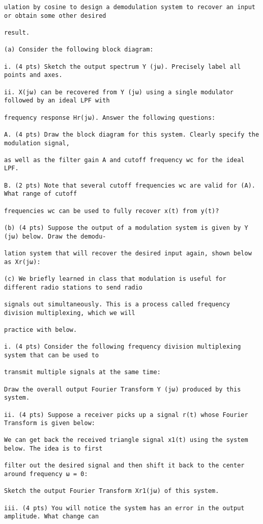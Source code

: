 \documentclass[11pt,addpoints]{exam}
\begin{document}
\begin{verbatim}
ulation by cosine to design a demodulation system to recover an input or obtain some other desired

result.

(a) Consider the following block diagram:

i. (4 pts) Sketch the output spectrum Y (jω). Precisely label all points and axes.

ii. X(jω) can be recovered from Y (jω) using a single modulator followed by an ideal LPF with

frequency response Hr(jω). Answer the following questions:

A. (4 pts) Draw the block diagram for this system. Clearly specify the modulation signal,

as well as the filter gain A and cutoff frequency wc for the ideal LPF.

B. (2 pts) Note that several cutoff frequencies wc are valid for (A). What range of cutoff

frequencies wc can be used to fully recover x(t) from y(t)?

(b) (4 pts) Suppose the output of a modulation system is given by Y (jω) below. Draw the demodu-

lation system that will recover the desired input again, shown below as Xr(jω):

(c) We briefly learned in class that modulation is useful for different radio stations to send radio

signals out simultaneously. This is a process called frequency division multiplexing, which we will

practice with below.

i. (4 pts) Consider the following frequency division multiplexing system that can be used to

transmit multiple signals at the same time:

Draw the overall output Fourier Transform Y (jω) produced by this system.

ii. (4 pts) Suppose a receiver picks up a signal r(t) whose Fourier Transform is given below:

We can get back the received triangle signal x1(t) using the system below. The idea is to first

filter out the desired signal and then shift it back to the center around frequency ω = 0:

Sketch the output Fourier Transform Xr1(jω) of this system.

iii. (4 pts) You will notice the system has an error in the output amplitude. What change can


\end{verbatim}
\end{document}
